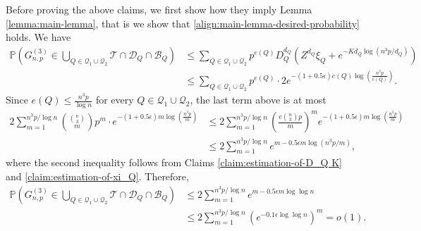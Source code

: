 \documentclass[11pt,a4paper,oneside,reqno]{amsart}
\newcommand{\Gnp}{G_{n, p}^{(3)}}
\newcommand{\cB}{\mathcal{B}}
\newcommand{\cD}{\mathcal{D}}
\newcommand{\cQ}{\mathcal{Q}}
\newcommand{\cT}{\mathcal{T}}
\renewcommand{\Pr}{\mathbb{P}}
\newcommand{\1}{\mathbbm{1}} %
\renewcommand{\le}{\leqslant}
\begin{document}
Before proving the above claims, we first show how they imply Lemma \ref{lemma:main-lemma}, that is we show that \eqref{align:main-lemma-desired-probability} holds. We have
\begin{align*}
    \Pr\left(\Gnp \in \bigcup_{Q \in \cQ_1 \cup \cQ_2} \cT \cap \cD_Q \cap \cB_Q\right) &\le \sum_{Q \in \cQ_1 \cup \cQ_2} p^{e(Q)} D_Q^{d_Q}\left(Z^{d_Q} \xi_Q + e^{-K d_Q \log(n^3 p / d_Q)}\right) \\
    &\le \sum_{Q \in \cQ_1 \cup \cQ_2} p^{e(Q)} \cdot 2 e^{-(1+0.5\epsilon) e(Q) \log\left(\frac{n^3 p}{e(Q)}\right)}.
\end{align*}
Since $e(Q) \le \frac{n^3 p}{\log n}$ for every $Q \in \cQ_1 \cup \cQ_2$, the last term above is at most
\begin{align*}    
    2\sum_{m=1}^{n^3 p/\log n} \binom{\binom{n}{3}}{m} p^m \cdot  e^{-(1+0.5\epsilon)m \log\left(\frac{n^3 p}{m}\right)} 
    &\le 2\sum_{m=1}^{n^3 p/\log n} \left(\frac{e\binom{n}{3}p}{m}\right)^{m} e^{-(1+0.5\epsilon)m \log\left(\frac{n^3 p}{m}\right)} \\
    &\le 2\sum_{m=1}^{n^3 p/\log n} e^{m - 0.5 \epsilon m \log\left(n^3 p / m\right)},
\end{align*}
where the second inequality follows from Claims \ref{claim:estimation-of-D_Q K} and \ref{claim:estimation-of-xi_Q}. Therefore,
\begin{align*}
    \Pr\left(\Gnp \in \bigcup_{Q \in \cQ_1 \cup \cQ_2} \cT \cap \cD_Q \cap \cB_Q\right) &\le 2\sum_{m=1}^{n^3 p / \log n} e^{m - 0.5 \epsilon m \log\log n} \\&\le 2\sum_{m=1}^{n^3 p / \log n} \left(e^{-0.1 \epsilon \log \log n}\right)^m = o(1).
\end{align*}
\end{document}
